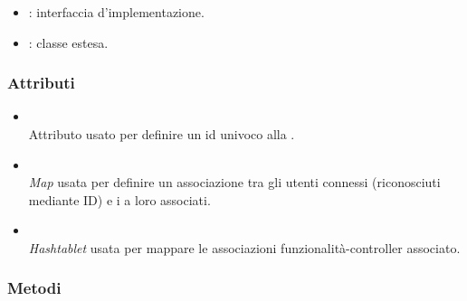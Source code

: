 \begin{itemize}
	\item {}: interfaccia d'implementazione.
	\item {}: classe estesa.
\end{itemize}

\subsubsection*{Attributi}

\begin{itemize}
	\item{}\\
	Attributo usato per definire un id univoco alla .
	\item{}\\
	\textit{Map} usata per definire un associazione tra gli utenti connessi (riconosciuti mediante ID) e i  a loro associati.
	\item{}\\
	\textit{Hashtablet} usata per mappare le associazioni funzionalità-controller associato.
\end{itemize}

\subsubsection*{Metodi}

